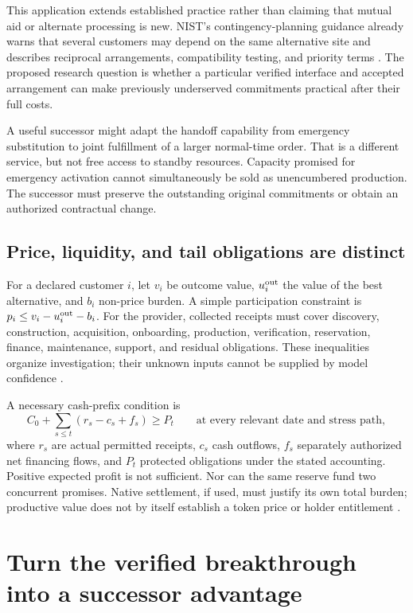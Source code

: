 \documentclass[11pt,a4paper]{article}
\begin{document}
This application extends established practice rather than claiming that mutual aid or alternate processing is new. NIST's contingency-planning guidance already warns that several customers may depend on the same alternative site and describes reciprocal arrangements, compatibility testing, and priority terms \cite[p.~23]{nist}. The proposed research question is whether a particular verified interface and accepted arrangement can make previously underserved commitments practical after their full costs.

A useful successor might adapt the handoff capability from emergency substitution to joint fulfillment of a larger normal-time order. That is a different service, but not free access to standby resources. Capacity promised for emergency activation cannot simultaneously be sold as unencumbered production. The successor must preserve the outstanding original commitments or obtain an authorized contractual change.

\subsection{Price, liquidity, and tail obligations are distinct}
For a declared customer $i$, let $v_i$ be outcome value, $u_i^{\rm out}$ the value of the best alternative, and $b_i$ non-price burden. A simple participation constraint is $p_i\le v_i-u_i^{\rm out}-b_i$. For the provider, collected receipts must cover discovery, construction, acquisition, onboarding, production, verification, reservation, finance, maintenance, support, and residual obligations. These inequalities organize investigation; their unknown inputs cannot be supplied by model confidence \cite[Sec.~8]{genesis}.

A necessary cash-prefix condition is
\begin{equation}
C_0+\sum_{s\le t}(r_s-c_s+f_s)\ge P_t\qquad\text{at every relevant date and stress path},\label{eq:cash}
\end{equation}
where $r_s$ are actual permitted receipts, $c_s$ cash outflows, $f_s$ separately authorized net financing flows, and $P_t$ protected obligations under the stated accounting. Positive expected profit is not sufficient. Nor can the same reserve fund two concurrent promises. Native settlement, if used, must justify its own total burden; productive value does not by itself establish a token price or holder entitlement \cite[Secs.~8--9]{economy}.

\section{Turn the verified breakthrough into a successor advantage}
\end{document}
